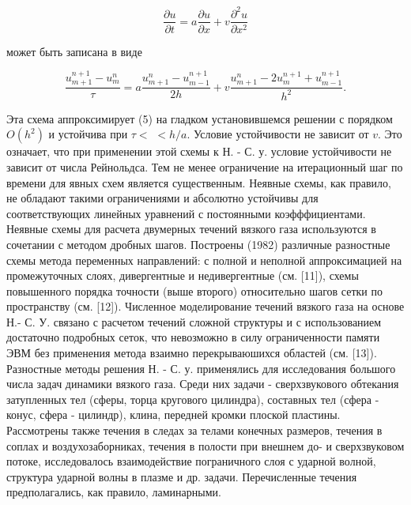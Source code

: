 \documentclass[10pt]{article}
\begin{document}
\[

\frac{\partial u}{\partial t}=a \frac{\partial u}{\partial x}+v \frac{\partial^{2} u}{\partial x^{2}}

\]



может быть записана в виде



\[

\frac{u_{m+1}^{n+1}-u_{m}^{n}}{\tau}=a \frac{u_{m+1}^{n}-u_{m-1}^{n+1}}{2 h}+v \frac{u_{m+1}^{n}-2 u_{m}^{n+1}+u_{m-1}^{n+1}}{h^{2}} .

\]



Эта схема аппроксимирует (5) на гладком установившемся решении с порядком $O\left(h^{2}\right)$ и устойчива при $\tau<$ $<h / a$. Условие устойчивости не зависит от $v$. Это означает, что при применении этой схемы к Н. - С. у. условие устойчивости не зависит от числа Рейнольдса. Тем не менее ограничение на итерационный шаг по времени для явных схем является существенным. Неявные схемы, как правило, не обладают такими ограничениями и абсолютно устойчивы для соответствующих линейных уравнений с постоянными коэфффициентами. Неявные схемы для расчета двумерных течений вязкого газа используются в сочетании с методом дробных шагов. Построены (1982) различные разностные схемы метода переменных направлений: с полной и неполной аппроксимацией на промежуточных слоях, дивергентные и недивергентные (см. [11]), схемы повышенного порядка точности (выше второго) относительно шагов сетки по пространству (см. [12]). Численное моделирование течений вязкого газа на основе Н.- С. У. связано с расчетом течений сложной структуры и с использованием достаточно подробных сеток, что невозможно в силу ограниченности памяти ЭВМ без применения метода взаимно перекрываюшихся областей (см. [13]). Разностные методы решения Н. - С. у. применялись для исследования большого числа задач динамики вязкого газа. Среди них задачи - сверхзвукового обтекания затупленных тел (сферы, торца кругового цилиндра), составных тел (сфера - конус, сфера - цилиндр), клина, передней кромки плоской пластины. Рассмотрены также течения в следах за телами конечных размеров, течения в соплах и воздухозаборниках, течения в полости при внешнем до- и сверхзвуковом потоке, исследовалось взаимодействие пограничного слоя с ударной волной, структура ударной волны в плазме и др. задачи. Перечисленные течения предполагались, как правило, ламинарными.
\end{document}
